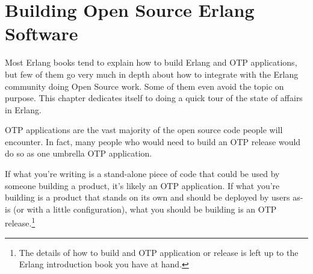 \documentclass[11pt, oneside]{book}   	%
\begin{document}


\chapter{Building Open Source Erlang Software}
\label{chap:building-open-source-erlang-software}

Most Erlang books tend to explain how to build Erlang and OTP applications, but few of them go very much in depth about how to integrate with the Erlang community doing Open Source work. Some of them even avoid the topic on purpose. This chapter dedicates itself to doing a quick tour of the state of affairs in Erlang.

OTP applications are the vast majority of the open source code people will encounter. In fact, many people who would need to build an OTP release would do so as one umbrella OTP application. 

If what you're writing is a stand-alone piece of code that could be used by someone building a product, it's likely an OTP application. If what you're building is a product that stands on its own and should be deployed by users as-is (or with a little configuration), what you should be building is an OTP release.\footnote{The details of how to build and OTP application or release is left up to the Erlang introduction book you have at hand.}
\end{document}
